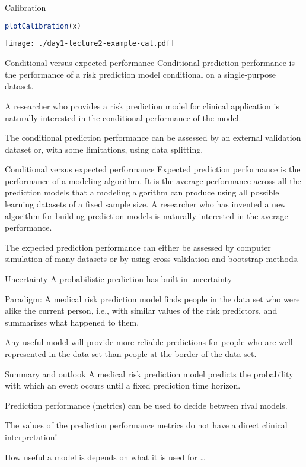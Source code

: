 \documentclass{beamer}\usepackage{listings}
\begin{document}
\begin{frame}[label={sec:orgcb9ee49},fragile]{Calibration}
 \begin{lstlisting}[language=r,numbers=none]
plotCalibration(x)
\end{lstlisting}

\begin{center}
\texttt{[image: ./day1-lecture2-example-cal.pdf]}
\end{center}
\end{frame}
\begin{frame}[label={sec:org4918c5e}]{Conditional versus expected performance}
Conditional prediction performance is the performance of a risk
prediction model conditional on a single-purpose dataset. 
\vfill

A researcher who provides a risk prediction model for clinical
application is naturally interested in the conditional performance of
the model.
\vfill

The conditional prediction performance can be assessed by
an external validation dataset or, with some limitations, using data
splitting.  
\end{frame}
\begin{frame}[label={sec:org39bf25c}]{Conditional versus expected performance}
Expected prediction performance is the performance
of a modeling algorithm.
It is the average performance across all the
prediction models that a modeling algorithm can produce using all
possible learning datasets of a fixed sample size.
\vfill
A researcher who
has invented a new algorithm for building prediction models is
naturally interested in the average performance.

\vfill
The expected
prediction performance can either be assessed by computer simulation
of many datasets or by using cross-validation and bootstrap methods.
\end{frame}
\begin{frame}[label={sec:org458e612}]{Uncertainty}
A probabilistic prediction has built-in uncertainty
\vfill

Paradigm: A medical risk prediction model finds people in the data set
who were alike the current person, i.e., with similar values of the
risk predictors, and summarizes what happened to them.  \vfill

Any useful model will provide more reliable predictions for people who
are well represented in the data set than people at the border of
the data set.
\end{frame}
\begin{frame}[label={sec:orga350973}]{Summary and outlook}
A medical risk prediction model predicts the probability with which an
event occurs until a fixed prediction time horizon.
\vfill

Prediction performance (metrics) can be used to decide between rival models.

\vfill

The values of the prediction performance metrics do not have a direct
clinical interpretation!

\vfill How useful a model is depends on what it is used for \dots{}
\end{frame}
\end{document}
